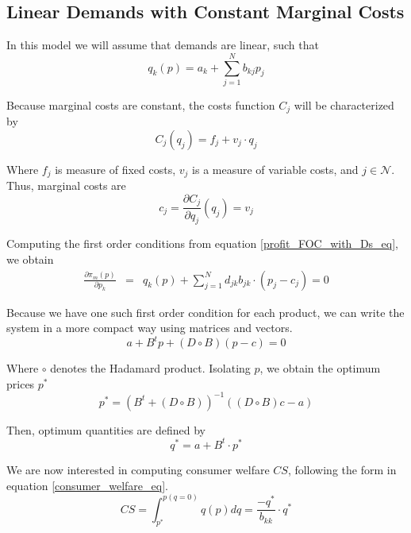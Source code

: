 \documentclass[12pt]{article}
\begin{document}
\subsection{Linear Demands with Constant Marginal Costs}

In this model we will assume that demands are linear, such that
\begin{equation*}
q_k(p) = a_k + \sum_{j=1}^N b_{kj}p_j
\end{equation*}

Because marginal costs are constant, the costs function $C_j$ will be characterized by
\begin{equation*}
C_j (q_j)= f_j + v_j \cdot q_j
\end{equation*}

Where $f_j$ is measure of fixed costs, $v_j$ is a measure of variable costs, and  $j \in \mathcal{N}$. Thus, marginal costs are
\begin{equation*}
c_j = \frac{\partial C_j}{\partial q_j}(q_j) = v_j
\end{equation*}

Computing the first order conditions from equation \ref{profit_FOC_with_Ds_eq}, we obtain
\begin{eqnarray*}
\frac{\partial\pi_m(p)}{\partial p_k}
&=& q_k(p) + \sum_{j = 1}^N d_{jk}b_{jk} \cdot (p_j - c_j) = 0
\end{eqnarray*}

Because we have one such first order condition for each product, we can write the system in a more compact way using matrices and vectors.
\begin{equation*}
a + B^t p + (D \circ B)(p - c) = 0
\end{equation*}

Where $\circ$ denotes the Hadamard product.
Isolating $p$, we obtain the optimum prices $p^*$
\begin{equation*}
p^* = (B^t + (D \circ B))^{-1}((D \circ B) c - a)
\end{equation*}

Then, optimum quantities are defined by
\begin{equation*}
q^* = a + B^t \cdot p^*
\end{equation*}

We are now interested in computing consumer welfare $CS$, following the form in equation \ref{consumer_welfare_eq}. 
\begin{equation*}
CS = \int_{p^*}^{p(q = 0)} q(p) dq = \frac{-q^*}{b_{kk}} \cdot q^*
\end{equation*}
\end{document}

